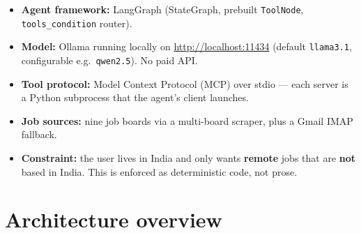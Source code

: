 \documentclass[11pt,a4paper]{article}
\newcommand{\file}[1]{\texttt{\small #1}}
\newcommand{\tool}[1]{\texttt{#1}}
\newcommand{\link}[1]{\url{#1}}
\begin{document}
\begin{itemize}
  \item \textbf{Agent framework:} LangGraph (StateGraph, prebuilt \file{ToolNode},
        \file{tools\_condition} router).
  \item \textbf{Model:} Ollama running locally on \link{http://localhost:11434}
        (default \tool{llama3.1}, configurable e.g.\ \tool{qwen2.5}). No paid
        API.
  \item \textbf{Tool protocol:} Model Context Protocol (MCP) over stdio — each
        server is a Python subprocess that the agent's client launches.
  \item \textbf{Job sources:} nine job boards via a multi-board scraper, plus a
        Gmail IMAP fallback.
  \item \textbf{Constraint:} the user lives in India and only wants
        \textbf{remote} jobs that are \textbf{not} based in India. This is
        enforced as deterministic code, not prose.
\end{itemize}

\section{Architecture overview}
\label{sec:arch}

\newcommand{\archnode}[4]{%
  \node[draw=#2!70, fill=#2!12, rounded corners=4pt,
        minimum width=#4, minimum height=2.1em, font=\small,
        blur shadow={shadow blur steps=5}] (#1) {#3};
}
\end{document}
